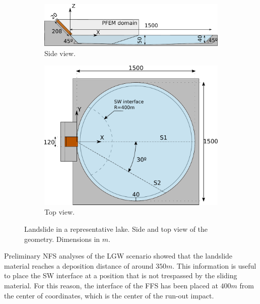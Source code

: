 \begin{figure}[ht]
    \centering
    \begin{subfigure}{0.6\textwidth}
        \includegraphics[width=\textwidth]{img/coupling/ex3_lateralview.pdf}
        \caption{Side view.}
        \label{ex3_lateralview}
    \end{subfigure}
    \par\medskip
    \begin{subfigure}{0.75\textwidth}
        \includegraphics[width=\textwidth]{img/coupling/ex3_topview.pdf}
        \caption{Top view.}
        \label{ex3_topview}
    \end{subfigure}
    \caption{Landslide in a representative lake. Side and top view of the geometry. Dimensions in $m$.}
    \label{lake_geometry}
\end{figure}



Preliminary NFS analyses of the LGW scenario showed that the landslide material reaches a deposition distance of around $350m$. This information is useful to place the SW interface at a position that is not trespassed by the sliding material. For this reason, the interface of the FFS has been placed at $400m$ from the center of coordinates, which is the center of the run-out impact. 



